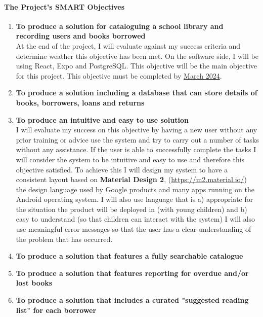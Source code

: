 \documentclass{article}
\begin{document}
\paragraph{The Project's SMART Objectives}

\begin{enumerate}
    \item \textbf{To produce a solution for cataloguing a school library and recording users and books borrowed}\\
    At the end of the project, I will evaluate against my success criteria and determine weather this objective has been met.
    On the software side, I will be using React, Expo and PostgreSQL. This objective will be the main objective for this project.
    This objective must be completed by \underline{March 2024}.

    \item \textbf{To produce a solution including a database that can store details of books, borrowers, loans and returns}\\
    
    \item \textbf{To produce an intuitive and easy to use solution}\\
    I will evaluate my success on this objective by having a new user without any prior training or advice use the system and
    try to carry out a number of tasks without any assistance. If the user is able to successfully complete the tasks
    I will consider the system to be intuitive and easy to use and therefore this objective satisfied.
    To achieve this I will design my system to have a consistent layout based on \textbf{Material Design 2}, (\url{https://m2.material.io/})
    the design language used by Google products and many apps running on the Android operating system. I will also use language that is
    a) appropriate for the situation the product will be deployed in (with young children) and b) easy to understand (so that children can interact with the system)
    I will also use meaningful error messages so that the user has a clear understanding of the problem that has occurred.

    \item \textbf{To produce a solution that features a fully searchable catalogue}
    
    \item \textbf{To produce a solution that features reporting for overdue and/or lost books}
    \item \textbf{To produce a solution that includes a curated "suggested reading list" for each borrower}
\end{enumerate}
\end{document}
